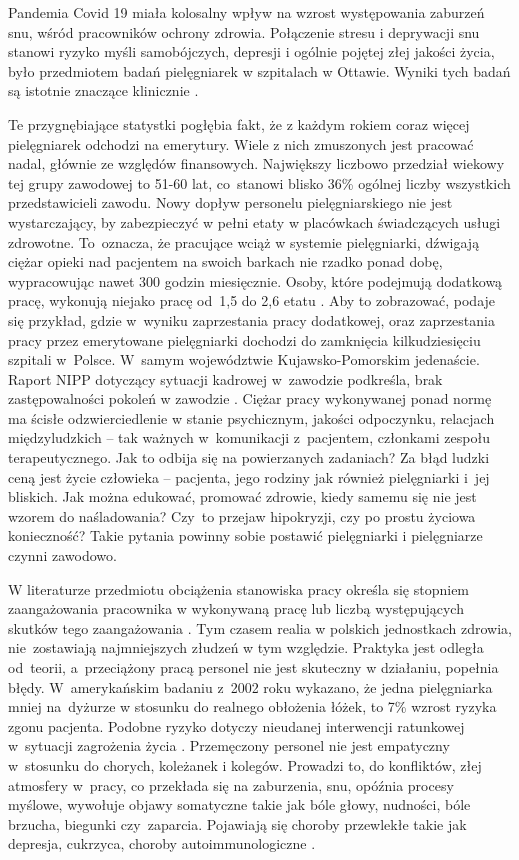 \documentclass[a4paper,12pt,twoside,openright]{mwrep}
\begin{document}
Pandemia Covid 19 miała kolosalny wpływ na wzrost występowania zaburzeń snu, wśród pracowników ochrony zdrowia. Połączenie stresu i deprywacji snu stanowi ryzyko myśli samobójczych, depresji i ogólnie pojętej złej jakości życia, było przedmiotem badań pielęgniarek w szpitalach w Ottawie. Wyniki tych badań są istotnie znaczące klinicznie \cite{sen}.

Te przygnębiające statystki pogłębia fakt, że z każdym rokiem coraz więcej pielęgniarek odchodzi na emerytury. Wiele z nich zmuszonych jest pracować nadal, głównie ze względów finansowych.  Największy liczbowo przedział wiekowy tej grupy zawodowej to 51-60 lat, co~stanowi blisko 36\% ogólnej liczby wszystkich przedstawicieli zawodu. Nowy dopływ personelu pielęgniarskiego nie jest wystarczający, by zabezpieczyć w pełni etaty w placówkach świadczących usługi zdrowotne. To~oznacza, że pracujące wciąż w systemie pielęgniarki, dźwigają ciężar opieki nad pacjentem na swoich barkach nie rzadko ponad dobę, wypracowując nawet 300 godzin miesięcznie. Osoby, które podejmują dodatkową pracę, wykonują niejako pracę od~1,5 do 2,6 etatu \cite{cyfrowe}. Aby to zobrazować, podaje się przykład, gdzie w~wyniku zaprzestania pracy dodatkowej, oraz zaprzestania pracy przez emerytowane pielęgniarki dochodzi do zamknięcia kilkudziesięciu szpitali w~Polsce. W~samym województwie Kujawsko-Pomorskim jedenaście. Raport NIPP dotyczący sytuacji kadrowej w~zawodzie podkreśla, brak zastępowalności pokoleń w zawodzie \cite{statystyka}. Ciężar pracy wykonywanej ponad normę ma ścisłe odzwierciedlenie w  stanie psychicznym, jakości  odpoczynku, relacjach międzyludzkich – tak ważnych w~komunikacji z~pacjentem, członkami zespołu terapeutycznego. Jak to odbija się na powierzanych zadaniach? Za błąd ludzki ceną jest życie człowieka – pacjenta, jego rodziny jak również pielęgniarki i~jej bliskich. Jak można edukować, promować zdrowie, kiedy samemu się nie jest wzorem do naśladowania? Czy~to przejaw hipokryzji, czy po prostu życiowa konieczność? Takie pytania powinny sobie postawić pielęgniarki i pielęgniarze czynni zawodowo.

W literaturze przedmiotu obciążenia stanowiska pracy określa się stopniem zaangażowania pracownika w wykonywaną pracę lub liczbą występujących skutków tego zaangażowania \cite{stanowisko}. Tym czasem realia w polskich jednostkach zdrowia, nie~zostawiają najmniejszych złudzeń w tym względzie. Praktyka jest odległa od~teorii, a~przeciążony pracą personel nie jest skuteczny w działaniu, popełnia błędy. W~amerykańskim badaniu z~2002 roku wykazano, że jedna pielęgniarka mniej na~dyżurze w stosunku do realnego obłożenia łóżek, to 7\% wzrost ryzyka zgonu pacjenta. Podobne ryzyko dotyczy nieudanej interwencji ratunkowej w~sytuacji zagrożenia życia \cite{rko}. Przemęczony personel nie jest empatyczny w~stosunku do chorych, koleżanek i kolegów. Prowadzi to, do konfliktów, złej atmosfery w~pracy, co przekłada się na zaburzenia, snu, opóźnia procesy myślowe, wywołuje objawy somatyczne takie jak bóle głowy, nudności, bóle brzucha, biegunki czy~zaparcia. Pojawiają się choroby przewlekłe takie jak depresja, cukrzyca, choroby autoimmunologiczne \cite{zdrowie}.
\end{document}
